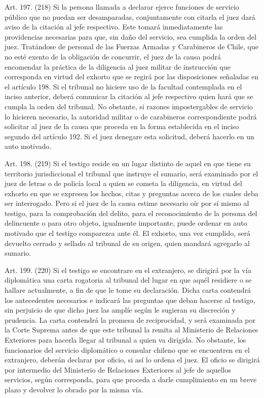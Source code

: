     Art. 197. (218) Si la persona llamada a declarar ejerce funciones de servicio público que no puedan ser desamparadas, conjuntamente con citarla el juez dará aviso de la citación al jefe respectivo. Este tomará inmediatamente las providencias necesarias para que, sin daño del servicio, sea cumplida la orden del juez.
    Tratándose de personal de las Fuerzas Armadas y Carabineros de Chile, que no esté exento de la obligación de concurrir, el juez de la causa podrá encomendar la práctica de la diligencia al juez militar de instrucción que corresponda en virtud del exhorto que se regirá por las disposiciones señaladas en el artículo 198.
    Si el tribunal no hiciere uso de la facultad contemplada en el inciso anterior, deberá comunicar la citación al jefe respectivo quien hará que se cumpla la orden del tribunal. No obstante, si razones impostergables de servicio lo hicieren necesario, la autoridad militar o de carabineros correspondiente podrá solicitar al juez de la causa que proceda en la forma establecida en el inciso segundo del artículo 192. Si el juez denegare esta solicitud, deberá hacerlo en un auto motivado.

    Art. 198. (219) Si el testigo reside en un lugar distinto de aquel en que tiene su territorio jurisdiccional el tribunal que instruye el sumario, será examinado por el juez de letras o de policía local a quien se cometa la diligencia, en virtud del exhorto en que se expresen los hechos, citas y preguntas acerca de los cuales deba ser interrogado.
    Pero si el juez de la causa estime necesario oír por sí mismo al testigo, para la comprobación del delito, para el reconocimiento de la persona del delincuente o para otro objeto, igualmente importante, puede ordenar en auto motivado que el testigo comparezca ante él.
    El exhorto, una vez cumplido, será devuelto cerrado y sellado al tribunal de su origen, quien mandará agregarlo al sumario.

    Art. 199. (220) Si el testigo se encontrare en el extranjero, se dirigirá por la vía diplomática una carta rogatoria al tribunal del lugar en que aquél residiere o se hallare actualmente, a fin de que le tome su declaración. Dicha carta contendrá los antecedentes necesarios e indicará las preguntas que deban hacerse al testigo, sin perjuicio de que dicho juez las amplíe según le sugieran su discreción y prudencia.
    La carta contendrá la promesa de reciprocidad, y será examinada por la Corte Suprema antes de que este tribunal la remita al Ministerio de Relaciones Exteriores para hacerla llegar al tribunal a quien va dirigida.
    No obstante, los funcionarios del servicio diplomático o consular chileno que se encuentren en el extranjero, deberán declarar por oficio, si así lo ordena el juez. El oficio se dirigirá por intermedio del Ministerio de Relaciones Exteriores al jefe de aquellos servicios, según corresponda, para que proceda a darle cumplimiento en un breve plazo y devolver lo obrado por la misma vía.

